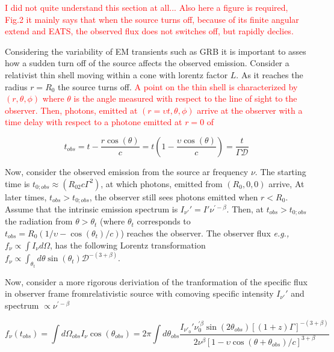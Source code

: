 \documentclass[11pt,a4paper,headinclude=true,DIV=14,BCOR=8mm,chapterprefix,listof=totoc,twoside,openright,abstracton]{scrbook}
\newcommand{\red}[1]{\textcolor{red}{#1}}
\begin{document}
\red{I did not quite understand this section at all...}
\red{Also here a figure is required, Fig.2}
\red{it mainly says that when the source turns off, because of its finite angular extend and EATS, the observed flux does not switches off, but rapidly declies.}


Considering the variability of EM transients such as GRB it is important to asses how a sudden turn off of the source affects the observed emission. 
Consider a relativist thin shell moving within a cone with lorentz factor $L$. As it reaches the radius $r=R_0$ the source turns off. 
\red{
A point on the thin shell is characterized by $(r,\theta,\phi)$ where $\theta$ is the angle measured with respect to the line of sight to the observer. Then, photons, emitted at $(r=\upsilon t, \theta,\phi)$ arrive at the observer with a time delay with respect to a photone emitted at $r=0$ of
}

\begin{equation}
    t_{obs} = t - \frac{r \cos(\theta)}{c} = t(1-\frac{\upsilon\cos(\theta)}{c}) = \frac{t}{\Gamma\mathcal{D}}
\end{equation}

Now, consider the observed emission from the source ar frequency $\nu$. The starting time is $t_{0;obs}\approx(R_02c\Gamma^2)$, at which photons, emitted from $(R_0,0,0)$ arrive, At later times, $t_{obs}>t_{0;obs}$, the observer still sees photons emitted when $r < R_0$. 
Assume that the intrinsic emission spectrum is $I_{\nu'}' = I'\nu^{'-\beta}$.
Then, at $t_{obs} > t_{0;obs}$ the radiation from $\theta > \theta_t$ (where $\theta_t$ corresponds to $t_{obs} = R_0(1/\upsilon - \cos(\theta_t)/c)$) reaches the observer.
The observer flux \textit{e.g.,} $f_{\nu} \propto \int I_{\nu} d\Omega$, has the following Lorentz transformation $f_{\nu}\propto\int_{\theta_t} d\theta \sin(\theta_t) \mathcal{D}^{-(3+\beta)}$.

Now, consider a more rigorous deriviation of the tranformation of the specific flux in observer frame fromrelativistic source with comoving specific intensity $I_{\nu'}'$ and spectrum $\propto \nu^{' -\beta}$

\begin{equation}
    f_{\nu}(t_{obs}) = \int d\Omega_{obs} I_{\nu} \cos(\theta_{obs}) = 2\pi \int d\theta_{obs} \frac{ I_{\nu'_0}' \nu_{0}^{'\beta}\sin(2\theta_{obs})[(1+z)\Gamma]^{-(3+\beta)} }{ 2\nu^{\beta} [ 1-\upsilon\cos(\theta + \theta_{obs}) / c ]^{3+\beta} }
\end{equation}
\end{document}
